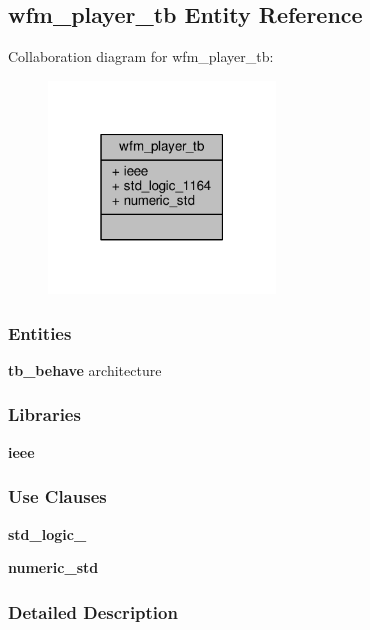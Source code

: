 \subsection{wfm\+\_\+player\+\_\+tb Entity Reference}
\label{classwfm__player__tb}


Collaboration diagram for wfm\+\_\+player\+\_\+tb\+:\nopagebreak
\begin{figure}[H]
\begin{center}
\leavevmode
\includegraphics[width=171pt]{d6/d6c/classwfm__player__tb__coll__graph}
\end{center}
\end{figure}
\subsubsection*{Entities}
\begin{DoxyCompactItemize}
\item 
{\bf tb\+\_\+behave} architecture
\end{DoxyCompactItemize}
\subsubsection*{Libraries}
 \begin{DoxyCompactItemize}
\item 
{\bf ieee} 
\end{DoxyCompactItemize}
\subsubsection*{Use Clauses}
 \begin{DoxyCompactItemize}
\item 
{\bf std\+\_\+logic\+\_}   
\item 
{\bf numeric\+\_\+std}   
\end{DoxyCompactItemize}


\subsubsection{Detailed Description}


